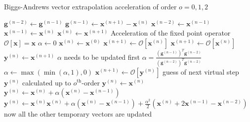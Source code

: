 \begin{algorithm}[bht] \footnotesize
\caption{Biggs-Andrews vector extrapolation acceleration of order $o=0,1,2$ }\label{algorithm:Biggs_Andrews}
\begin{algorithmic}[1]
    \State $\mathbf{g}^{(n-2)} \gets \mathbf{g}^{(n-1)}$
    \State $\mathbf{g}^{(n-1)} \gets \mathbf{x}^{(n+1)}-\mathbf{x}^{(n)}$
    \State $\mathbf{x}^{(n-2)} \gets \mathbf{x}^{(n-1)}$
    \State $\mathbf{x}^{(n-1)} \gets \mathbf{x}^{(n)}$
    \State $\mathbf{x}^{(n)} \gets \mathbf{x}^{(n+1)}$
\EndProcedure
\State \Comment Acceleration of the fixed point operator $\mathcal{O}[\mathbf{x}]=\mathbf{x}$
\State $\alpha \gets 0$
\State $\mathbf{x}^{(n)} \gets \mathbf{x}^{(0)}$
\State $\mathbf{x}^{(n+1)} \gets \mathcal{O}[\mathbf{x}^{(n)}]$
\State {}
\State $\mathbf{x}^{(n+1)} \gets \mathcal{O}[\mathbf{x}^{(n)}]$
\State {}
\State $\mathbf{y}^{(n)} \gets  \mathbf{x}^{(n+1)}$
    \State \Comment $\alpha$ needs to be updated first
    \State $\alpha = \frac{\left(\mathbf{g}^{(n-1)}\right)^T\mathbf{g}^{(n-2)}}{\left(\mathbf{g}^{(n-2)}\right)^T\mathbf{g}^{(n-2)}}$
    \State $\alpha \gets \max (\min (\alpha,1),0)$
    \State $\mathbf{x}^{(n+1)} \gets \mathcal{O}[\mathbf{y}^{(n)}]$
    \State \Comment  guess of next virtual step $\mathbf{y}^{(n)}$ calculated up to $o^\mathrm{th}$-order
        \State $\mathbf{y}^{(n)} \gets \mathbf{x}^{(n)}$
        \State $\mathbf{y}^{(n)} \gets \mathbf{x}^{(n)} + \alpha \left(\mathbf{x}^{(n)}-\mathbf{x}^{(n-1)}\right)$
    \Else
        \State $\mathbf{y}^{(n)} \gets \mathbf{x}^{(n)}\mathbf{x}^{(n)} + \alpha \left(\mathbf{x}^{(n)}-\mathbf{x}^{(n-1)}\right)
                                                                        + \frac{\alpha^2}{2}\left(\mathbf{x}^{(n)}+2\mathbf{x}^{(n-1)}-\mathbf{x}^{(n-2)}\right)$
    \EndIf
    \State \Comment now all the other temporary vectors are updated
    \State {}

\EndWhile
\EndProcedure
\end{algorithmic}
\end{algorithm}

